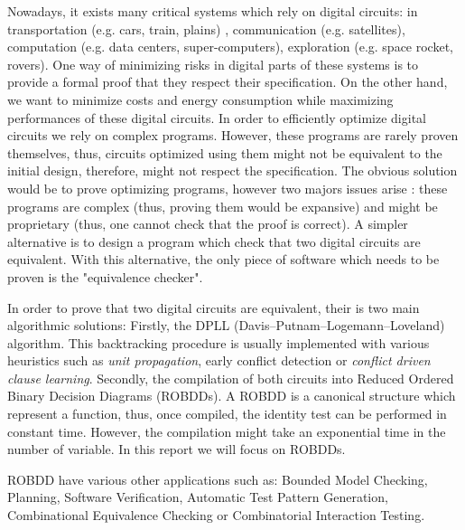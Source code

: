 \documentclass[a4paper,10pt]{article}
\begin{document}
Nowadays, it exists many critical systems which rely on digital circuits: in transportation (e.g. cars, train, plains) , communication (e.g. satellites), computation (e.g. data centers, super-computers), exploration (e.g. space rocket, rovers).
One way of minimizing risks in digital parts of these systems is to provide a formal proof that they respect their specification.
On the other hand, we want to minimize costs and energy consumption while maximizing performances of these digital circuits.
In order to efficiently optimize digital circuits we rely on complex programs.
However, these programs are rarely proven themselves, thus, circuits optimized using them might not be equivalent to the initial design, therefore, might not respect the specification.
The obvious solution would be to prove optimizing programs, however two majors issues arise : these programs are complex  (thus, proving them would be expansive) and might be proprietary (thus, one cannot check that the proof is correct).
A simpler alternative is to design a program which check that two digital circuits are equivalent.
With this alternative, the only piece of software which needs to be proven is the "equivalence checker".


In order to prove that two digital circuits are equivalent, their is two main algorithmic solutions:
Firstly, the DPLL (Davis–Putnam–Logemann–Loveland) algorithm.
This backtracking procedure is usually implemented with various heuristics such as \textit{unit propagation}, early conflict detection or \textit{conflict driven clause learning}.
Secondly, the compilation of both circuits into Reduced Ordered Binary Decision Diagrams (ROBDDs).
A ROBDD is a canonical structure which represent a function, thus, once compiled, the identity test can be performed in constant time.
However, the compilation might take an exponential time in the number of variable.
In this report we will focus on ROBDDs.


ROBDD have various other applications such as: Bounded Model Checking, Planning, Software Verification, Automatic Test Pattern Generation, Combinational Equivalence Checking or Combinatorial Interaction Testing.

\end{document}
